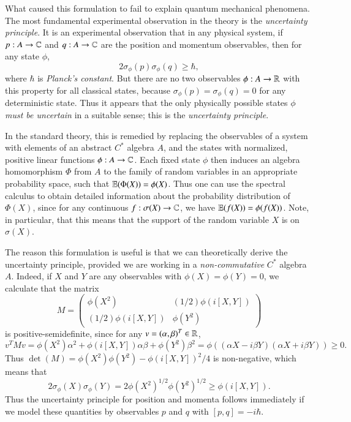 What caused this formulation to fail to explain quantum mechanical phenomena. The most fundamental experimental observation in the theory is the \emph{uncertainty principle}. It is an experimental observation that in any physical system, if $p: A \to \operatorname{\mathbb{C}}$ and $q: A \to \operatorname{\mathbb{C}}$ are the position and momentum observables, then for any state $\phi$,
%
\[ 2 \sigma_\phi(p) \sigma_\phi(q) \geq \hbar, \]
%
where $\hbar$ is \emph{Planck's constant}. But there are no two observables $\phi: A \to \operatorname{\mathbb{R}}$ with this property for all classical states, because $\sigma_\phi(p) = \sigma_\phi(q) = 0$ for any deterministic state. Thus it appears that the only physically possible states $\phi$ \emph{must be uncertain} in a suitable sense; this is the \emph{uncertainty principle}.

In the standard theory, this is remedied by replacing the observables of a system with elements of an abstract $C^*$ algebra $A$, and the states with normalized, positive linear functions $\phi: A \to \operatorname{\mathbb{C}}$. Each fixed state $\phi$ then induces an algebra homomorphism $\Phi$ from $A$ to the family of random variables in an appropriate probability space, such that $\operatorname{\mathbb{E}}(\Phi(X)) = \phi(X)$. Thus one can use the spectral calculus to obtain detailed information about the probability distribution of $\Phi(X)$, since for any continuous $f: \sigma(X) \to \operatorname{\mathbb{C}}$, we have $\operatorname{\mathbb{E}}(f(X)) = \phi(f(X))$. Note, in particular, that this means that the support of the random variable $X$ is on $\sigma(X)$.

The reason this formulation is useful is that we can theoretically derive the uncertainty principle, provided we are working in a \emph{non-commutative} $C^*$ algebra $A$. Indeed, if $X$ and $Y$ are any observables with $\phi(X) = \phi(Y) = 0$, we calculate that the matrix
%
\[ M = \begin{pmatrix} \phi(X^2) & (1/2) \phi(i [X,Y]) \\ (1/2) \phi(i[X,Y]) & \phi(Y^2) \end{pmatrix} \]
%
is positive-semidefinite, since for any $v = (\alpha,\beta)^T \in \operatorname{\mathbb{R}}$,
%
\[ v^T M v = \phi(X^2) \alpha^2 + \phi(i[X,Y]) \alpha \beta + \phi(Y^2) \beta^2 = \phi((\alpha X - i \beta Y)(\alpha X + i \beta Y)) \geq 0. \]
%
Thus $\det(M) = \phi(X^2) \phi(Y^2) - \phi(i[X,Y])^2 / 4$ is non-negative, which means that
%
\[ 2 \sigma_\phi(X) \sigma_\phi(Y) = 2 \phi(X^2)^{1/2} \phi(Y^2)^{1/2} \geq \phi(i[X,Y]). \]
%
Thus the uncertainty principle for position and momenta follows immediately if we model these quantities by observables $p$ and $q$ with $[p,q] = -i \hbar$.

